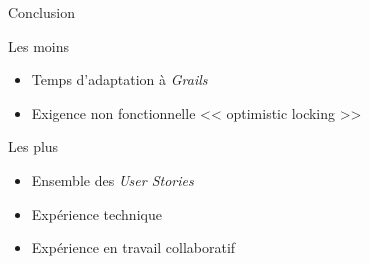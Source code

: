 \AntoineSpeak
\begin{frame}{Conclusion}
	\begin{alertblock}{Les moins}
		\begin{itemize}
			\item Temps d'adaptation à \textit{Grails}
			\item Exigence non fonctionnelle << optimistic locking	>> 
 
		\end{itemize}
	\end{alertblock}
	\pause
	\vfill
	\begin{exampleblock}{Les plus}
		\begin{itemize}
			\item Ensemble des \textit{User Stories}  \cmark
			\item Expérience technique
			\item Expérience en travail collaboratif
		\end{itemize}
	\end{exampleblock}	
\end{frame}

